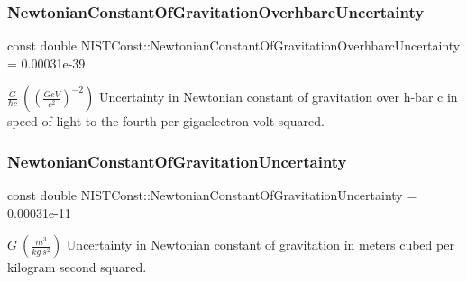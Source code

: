 \subsubsection{\texorpdfstring{Newtonian\+Constant\+Of\+Gravitation\+Overhbarc\+Uncertainty}{NewtonianConstantOfGravitationOverhbarcUncertainty}}
{\footnotesize\ttfamily const double N\+I\+S\+T\+Const\+::\+Newtonian\+Constant\+Of\+Gravitation\+Overhbarc\+Uncertainty = 0.\+00031e-\/39}

$\frac{G}{\hbar c} \ ((\frac{GeV}{c^2})^{-2})$ Uncertainty in Newtonian constant of gravitation over h-\/bar c in speed of light to the fourth per gigaelectron volt squared. \mbox{\label{group___gravitational_constant_ga8fc40fce6dc42f5e84a3c908553e6586}} 
\subsubsection{\texorpdfstring{Newtonian\+Constant\+Of\+Gravitation\+Uncertainty}{NewtonianConstantOfGravitationUncertainty}}
{\footnotesize\ttfamily const double N\+I\+S\+T\+Const\+::\+Newtonian\+Constant\+Of\+Gravitation\+Uncertainty = 0.\+00031e-\/11}

$G \ (\frac{m^3}{kg\ s^2})$ Uncertainty in Newtonian constant of gravitation in meters cubed per kilogram second squared. 